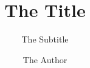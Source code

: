 \documentclass{beamer}
\title{The Title}
\subtitle{The Subtitle}
\author{The Author}
\begin{document}
\begin{frame}
\maketitle
\end{frame}
\end{document}
